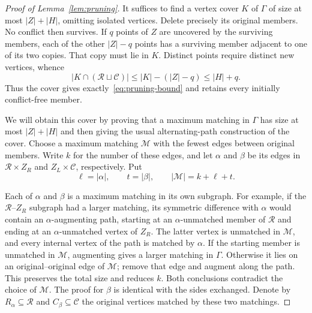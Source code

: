 \documentclass[11pt]{article}
\theoremstyle{remark}
\newcommand{\abs}[1]{\lvert #1\rvert}
\begin{document}
\begin{proof}[Proof of Lemma~\ref{lem:pruning}]
It suffices to find a vertex cover $K$ of $\Gamma$ of size at most
$\abs Z+\abs H$, omitting isolated vertices.  Delete precisely its
original members.  No conflict then survives.  If $q$ points of $Z$ are
uncovered by the surviving members, each of the other $\abs Z-q$ points
has a surviving member adjacent to one of its two copies.  That copy
must lie in $K$.  Distinct points require distinct new vertices, whence
\begin{equation}\label{eq:cover-charge}
 \abs{K\cap(\mathcal R\sqcup\mathcal C)}
 \leq \abs K-(\abs Z-q)\leq\abs H+q.
\end{equation}
Thus the cover gives exactly~\eqref{eq:pruning-bound} and retains every
initially conflict-free member.

We will obtain this cover by proving that a maximum matching in $\Gamma$
has size at most $\abs Z+\abs H$ and then giving the usual alternating-path
construction of the cover.  Choose a maximum matching $\mathcal M$ with
the fewest edges between original members.  Write $k$ for the number of
these edges, and let $\alpha$ and $\beta$ be its edges in
$\mathcal R\times Z_R$ and $Z_L\times\mathcal C$, respectively.  Put
\[
 \ell=\abs\alpha,\qquad t=\abs\beta,
 \qquad\abs{\mathcal M}=k+\ell+t.
\]

Each of $\alpha$ and $\beta$ is a maximum matching in its own subgraph.
For example, if the $\mathcal R$--$Z_R$ subgraph had a larger matching,
its symmetric difference with $\alpha$ would contain an
$\alpha$-augmenting path, starting at an $\alpha$-unmatched member of
$\mathcal R$ and ending at an $\alpha$-unmatched vertex of $Z_R$.
The latter vertex is unmatched in $\mathcal M$, and every internal vertex
of the path is matched by $\alpha$.  If the starting member is unmatched
in $\mathcal M$, augmenting gives a larger matching in $\Gamma$.
Otherwise it lies on an original--original edge of $\mathcal M$;
remove that edge and augment along the path.  This preserves the total
size and reduces $k$.  Both conclusions contradict the choice of
$\mathcal M$.  The proof for $\beta$ is identical with the sides
exchanged.  Denote by $R_\alpha\subseteq\mathcal R$ and
$C_\beta\subseteq\mathcal C$ the original vertices matched by these
two matchings.


\end{proof}
\end{document}
